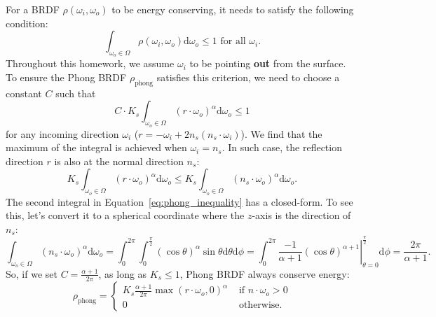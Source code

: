 For a BRDF $\rho(\omega_i, \omega_o)$ to be energy conserving, it needs to satisfy the following condition:
\begin{equation}
\int_{\omega_o \in \Omega} \rho(\omega_i, \omega_o) \mathrm{d}\omega_o \leq 1 \text{ for all } \omega_i.
\end{equation}
Throughout this homework, we assume $\omega_i$ to be pointing \textbf{out} from the surface.
To ensure the Phong BRDF $\rho_{\text{phong}}$ satisfies this criterion, we need to choose a constant $C$ such that
\begin{equation}
C \cdot K_s \int_{\omega_o \in \Omega} \left(r \cdot \omega_o\right)^\alpha \mathrm{d} \omega_o \leq 1
\end{equation}
for any incoming direction $\omega_i$ ($r = -\omega_i + 2 n_s \left(n_s \cdot \omega_i\right)$). 
We find that the maximum of the integral is achieved when $\omega_i = n_s$. In such case, the reflection direction $r$ is also at the normal direction $n_s$:
\begin{equation}
K_s \int_{\omega_o \in \Omega} \left(r \cdot \omega_o\right)^\alpha \mathrm{d} \omega_o \leq K_s \int_{\omega_o \in \Omega} \left(n_s \cdot \omega_o\right)^{\alpha} \mathrm{d} \omega_o.
\label{eq:phong_inequality}
\end{equation}
The second integral in Equation~\eqref{eq:phong_inequality} has a closed-form. To see this, let's convert it to a spherical coordinate where the $z$-axis is the direction of $n_s$:
\begin{equation}
\int_{\omega_o \in \Omega} \left(n_s \cdot \omega_o\right)^{\alpha} \mathrm{d} \omega_o = 
\int_{0}^{2\pi}\int_{0}^{\frac{\pi}{2}} \left(\cos\theta\right)^{\alpha} \sin\theta \mathrm{d}\theta \mathrm{d}\phi = 
\int_{0}^{2\pi} \left. \frac{-1}{\alpha + 1} \left(\cos\theta\right)^{\alpha + 1} \right|_{\theta=0}^{\frac{\pi}{2}} \mathrm{d}\phi = \frac{2\pi}{\alpha + 1}.
\label{eq:phong_normalization}
\end{equation}
So, if we set $C = \frac{\alpha + 1}{2\pi}$, as long as $K_s \leq 1$, Phong BRDF always conserve energy:
\begin{equation}
\rho_{\text{phong}} = \begin{cases}
K_s \frac{\alpha + 1}{2\pi} \max\left(r \cdot \omega_o, 0\right)^\alpha & \text{ if } n \cdot \omega_o > 0 \\
0 & \text{ otherwise.} 
\end{cases}
\label{eq:phong}
\end{equation}

